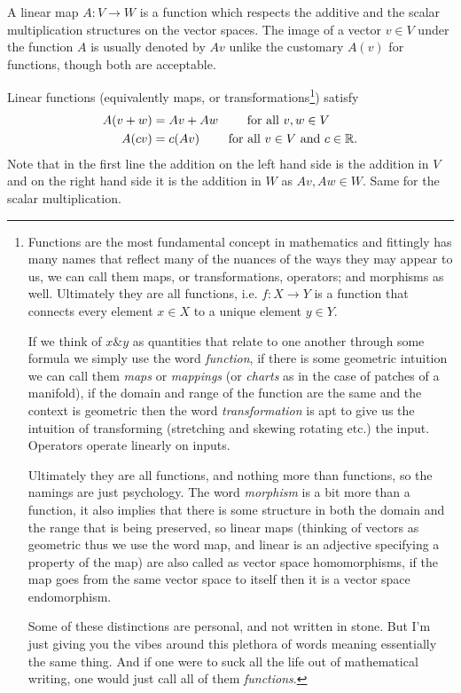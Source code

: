\documentclass[12pt]{amsart}
\begin{document}
A linear map $A:V \to W$ is a function which respects the additive and the scalar multiplication structures on the vector spaces. The image of a vector $v\in V$ under the function $A$ is usually denoted by $Av$ unlike the customary $A(v)$ for functions, though both are acceptable.

Linear functions (equivalently maps, or transformations\footnote{Functions are the most fundamental concept in mathematics and fittingly has many names that reflect many of the nuances of the ways they may appear to us, we can call them maps, or transformations, operators; and morphisms as well. Ultimately they are all functions, i.e. $f : X \to Y$ is a function that connects every element $x \in X$ to a unique element $y \in Y$. 
	
	If we think of $x \& y$ as quantities that relate to one another through some formula we simply use the word \emph{function}, if there is some geometric intuition we can call them \emph{maps} or \emph{mappings} (or \emph{charts} as in the case of patches of a manifold), if the domain and range of the function are the same and the context is geometric then the word \emph{transformation} is apt to give us the intuition of transforming (stretching and skewing rotating etc.) the input. Operators operate linearly on inputs.
	
	Ultimately they are all functions, and nothing more than functions, so the namings are just psychology. The word \emph{morphism} is a bit more than a function, it also implies that there is some structure in both the domain and the range that is being preserved, so linear maps (thinking of vectors as geometric thus we use the word map, and linear is an adjective specifying a property of the map) are also called as vector space homomorphisms, if the map goes from the same vector space to itself then it is a vector space endomorphism. 
	
	Some of these distinctions are personal, and not written in stone. But I'm just giving you the vibes around this plethora of words meaning essentially the same thing. And if one were to suck all the life out of mathematical writing, one would just call all of them \emph{functions}.}) satisfy
\begin{align*}
	A(v + w) &= Av + Aw \qquad \text{ for all } v, w \in V\\
	A(cv) &= c (Av) \qquad \text{ for all } v \in V \text{ and } c \in \mathbb{R}.
\end{align*}
Note that in the first line the addition on the left hand side is the addition in $V$ and on the right hand side it is the addition in $W$ as $Av, Aw \in W$. Same for the scalar multiplication.
\end{document}
